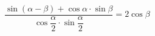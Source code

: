 \begin{ex}[type=prove_identity]
	\begin{condition}
		\(\dfrac{\sin(\alpha-\beta)+\cos\alpha\cdot\sin\beta}{\cos\dfrac{\alpha}{2}\cdot\sin\dfrac{\alpha}{2}}=2\cos\beta \)
	\end{condition}
\end{ex}